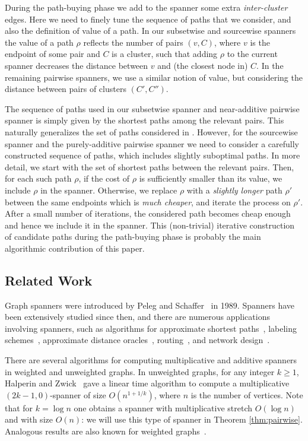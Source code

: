 \documentclass[a4paper,11pt]{article}
\theoremstyle{definition}
\begin{document}
During the path-buying phase we add to the spanner some extra \emph{inter-cluster} edges. Here we need to finely tune the sequence of paths that we consider, and also the definition of value of a path. In our subsetwise and sourcewise spanners the value of a path $\rho$ reflects the number of pairs $(v,C)$, where $v$ is the endpoint of some pair and $C$ is a cluster, such that adding $\rho$ to the current spanner decreases the distance between $v$ and (the closest node in) $C$. In the remaining pairwise spanners, we use a similar notion of value, but considering the distance between pairs of clusters $(C',C'')$. 

The sequence of paths used in our subsetwise spanner and near-additive pairwise spanner is simply given by the shortest paths among the relevant pairs. This naturally generalizes the set of paths considered in \cite{BKMP05}. However, for the sourcewise spanner and the purely-additive pairwise spanner we need to consider a carefully constructed sequence of paths, which includes slightly suboptimal paths. In more detail, we start with the set of shortest paths between the relevant pairs. Then, for each such path $\rho$, if the cost of $\rho$ is sufficiently smaller than its value, we include $\rho$ in the spanner. Otherwise, we replace $\rho$ with a \emph{slightly longer} path $\rho'$ between the same endpoints which is \emph{much cheaper}, and iterate the process on $\rho'$. After a small number of iterations, the considered path becomes cheap enough and hence we include it in the spanner. 
This (non-trivial) iterative construction of candidate paths during the path-buying phase is probably the main algorithmic contribution of this paper. 


\subsection{Related Work}
\label{sec:related}


Graph spanners were introduced by Peleg and Schaffer~\cite{PS89} in 1989. Spanners have been extensively 
studied since then, and there are numerous applications involving spanners, such as algorithms for 
approximate shortest paths~\cite{ABCP98,C93,E05}, labeling schemes~\cite{P00,GPPR01}, 
approximate distance oracles~\cite{TZ01,BS04,BK06}, 
routing~\cite{AP92,C01,CW04}, and network design~\cite{PU89}. 

There are several algorithms for computing multiplicative and additive spanners in weighted and 
unweighted graphs. In unweighted graphs, for any integer $k \ge 1$, Halperin and Zwick~\cite{HZ96} 
gave a linear time algorithm to compute a multiplicative $(2k-1,0)$-spanner of size $O(n^{1+1/k})$, 
where $n$ is the number of vertices. 
Note that for $k=\log n$ one obtains a spanner with multiplicative stretch $O(\log n)$ and with size $O(n)$: we will use this type of spanner in Theorem \ref{thm:pairwise}. 
Analogous results are also known for weighted graphs~\cite{BS03,RMZ05,RZ04}.
\end{document}
